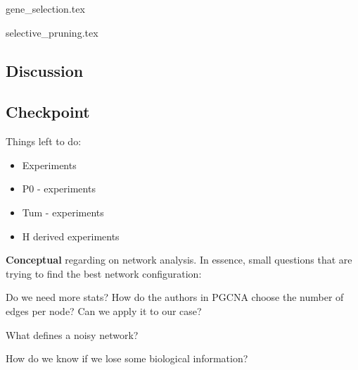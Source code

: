 {gene_selection.tex}
\newpage

\newpage
{selective_pruning.tex}

\newpage

\subsection{Discussion}


\subsection{Checkpoint}


Things left to do:
\begin{itemize}
    \item Experiments 
    \item P0 - experiments
    \item Tum - experiments
    \item H derived experiments
\end{itemize}
\vspace{1cm}
\textbf{Conceptual} regarding on network analysis. In essence, small questions that are trying to find the best network configuration:
\begin{todolist}
    \item Do we need more stats? How do the authors in PGCNA choose the number of edges per node? Can we apply it to our case?
    \item What defines a noisy network?
    \item How do we know if we lose some biological information?
\end{todolist}